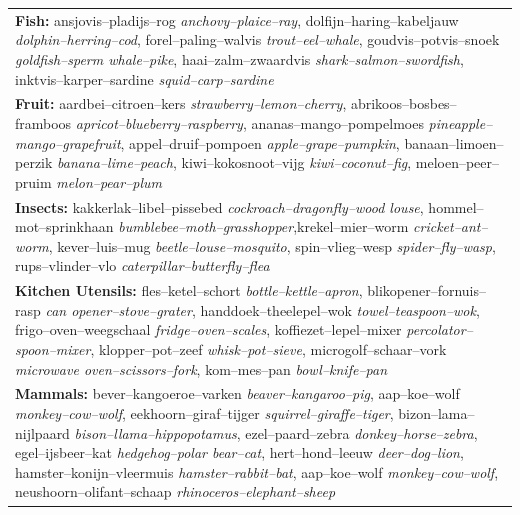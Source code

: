 \documentclass[doc]{apa6}
\begin{document}
\begin{appendix}
\begin{small}
\begin{longtable}{p{14cm}}
\textbf{Fish:} ansjovis--pladijs--rog \textit{anchovy--plaice--ray}, dolfijn--haring--kabeljauw \textit{ dolphin--herring--cod},
forel--paling--walvis \textit{trout--eel--whale}, goudvis--potvis--snoek \textit{ goldfish--sperm whale--pike},
haai--zalm--zwaardvis \textit{shark--salmon--swordfish}, inktvis--karper--sardine \textit{ squid--carp--sardine}
\smallskip \\

\textbf{Fruit:} aardbei--citroen--kers \textit{strawberry--lemon--cherry}, abrikoos--bosbes--framboos \textit{ apricot--blueberry--raspberry},
ananas--mango--pompelmoes \textit{pineapple--mango--grapefruit}, appel--druif--pompoen \textit{ apple--grape--pumpkin},
banaan--limoen--perzik \textit{banana--lime--peach}, kiwi--kokosnoot--vijg \textit{ kiwi--coconut--fig},
meloen--peer--pruim \textit{melon--pear--plum}
\smallskip \\

\textbf{Insects:} kakkerlak--libel--pissebed \textit{cockroach--dragonfly--wood louse}, hommel--mot--sprinkhaan \textit{ bumblebee--moth--grasshopper},krekel--mier--worm \textit{cricket--ant--worm}, kever--luis--mug \textit{ beetle--louse--mosquito},
spin--vlieg--wesp \textit{spider--fly--wasp}, rups--vlinder--vlo \textit{ caterpillar--butterfly--flea}
\smallskip \\

\textbf{Kitchen Utensils:} fles--ketel--schort \textit{bottle--kettle--apron}, blikopener--fornuis--rasp \textit{ can opener--stove--grater}, handdoek--theelepel--wok \textit{towel--teaspoon--wok}, frigo--oven--weegschaal \textit{ fridge--oven--scales},
koffiezet--lepel--mixer \textit{percolator--spoon--mixer}, klopper--pot--zeef \textit{ whisk--pot--sieve},
microgolf--schaar--vork \textit{microwave oven--scissors--fork}, kom--mes--pan \textit{ bowl--knife--pan}
\smallskip \\

\textbf{Mammals:} bever--kangoeroe--varken \textit{beaver--kangaroo--pig}, aap--koe--wolf \textit{ monkey--cow--wolf},
eekhoorn--giraf--tijger \textit{squirrel--giraffe--tiger}, bizon--lama--nijlpaard \textit{ bison--llama--hippopotamus},
ezel--paard--zebra \textit{donkey--horse--zebra}, egel--ijsbeer--kat \textit{ hedgehog--polar bear--cat},
hert--hond--leeuw \textit{deer--dog--lion}, hamster--konijn--vleermuis \textit{ hamster--rabbit--bat},
aap--koe--wolf \textit{monkey--cow--wolf}, neushoorn--olifant--schaap \textit{ rhinoceros--elephant--sheep}
\smallskip \\


\end{longtable}
\end{small}
\end{appendix}
\end{document}
